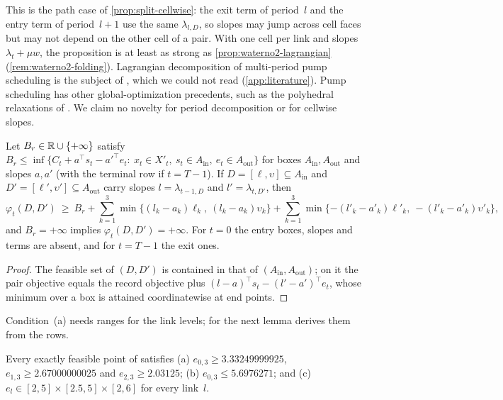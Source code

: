 This is the path case of \cref{prop:split-cellwise}: the exit term of period~$l$ and the entry term of period~$l+1$ use the same $\lambda_{l,D}$, so slopes may jump across cell faces but may not depend on the other cell of a pair.
With one cell per link and slopes $\lambda_t+\mu w$, the proposition is at least as strong as \cref{prop:waterno2-lagrangian} (\cref{rem:waterno2-folding}).
Lagrangian decomposition of multi-period pump scheduling is the subject of \citet{ghaddar2015-a-lagrangian-decomposition-approach-for}, which we could not read (\cref{app:literature}).
Pump scheduling has other global-optimization precedents, such as the polyhedral relaxations of \citet{tasseff2022-polyhedral-relaxations-for-optimal-pump}.
We claim no novelty for period decomposition or for cellwise slopes.

\begin{lemma}\label{lem:waterno2-reuse}
Let $B_r\in\mathbb{R}\cup\{+\infty\}$ satisfy $B_r\le\inf\{C_t+a^{\top}s_t-a'^{\top}e_t:\ x_t\in X'_t,\ s_t\in A_{\mathrm{in}},\ e_t\in A_{\mathrm{out}}\}$ for boxes $A_{\mathrm{in}},A_{\mathrm{out}}$ and slopes $a,a'$ (with the terminal row if $t=T-1$).
If $D=[\ell,\upsilon]\subseteq A_{\mathrm{in}}$ and $D'=[\ell',\upsilon']\subseteq A_{\mathrm{out}}$ carry slopes $l=\lambda_{t-1,D}$ and $l'=\lambda_{t,D'}$, then
\[
\varphi_t(D,D')\ \ge\ B_r+\sum_{k=1}^3\min\{(l_k-a_k)\ell_k,\ (l_k-a_k)\upsilon_k\}+\sum_{k=1}^3\min\{-(l'_k-a'_k)\ell'_k,\ -(l'_k-a'_k)\upsilon'_k\},
\]
and $B_r=+\infty$ implies $\varphi_t(D,D')=+\infty$.
For $t=0$ the entry boxes, slopes and terms are absent, and for $t=T-1$ the exit ones.
\end{lemma}

\begin{proof}
The feasible set of $(D,D')$ is contained in that of $(A_{\mathrm{in}},A_{\mathrm{out}})$; on it the pair objective equals the record objective plus $(l-a)^{\top}s_t-(l'-a')^{\top}e_t$, whose minimum over a box is attained coordinatewise at end points.
\end{proof}

Condition~(a) needs ranges for the link levels; for  the next lemma derives them from the rows.

\begin{lemma}\label{lem:waterno2-levels}
Every exactly feasible point of  satisfies
(a) $e_{0,3}\ge3.33249999925$, $e_{1,3}\ge2.67000000025$ and $e_{2,3}\ge2.03125$;
(b) $e_{0,3}\le5.6976271$; and
(c) $e_l\in[2,5]\times[2.5,5]\times[2,6]$ for every link~$l$.
\end{lemma}

